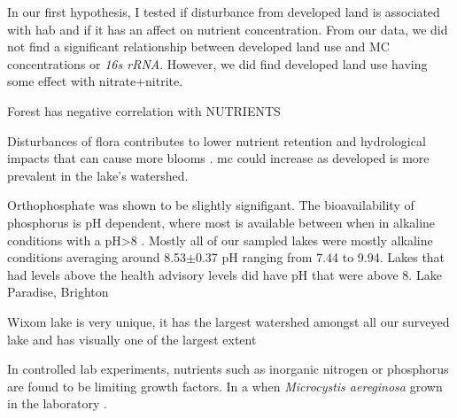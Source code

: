 
In our first hypothesis, I tested if disturbance from developed land is associated with \gls{hab} and if it has an affect on nutrient concentration.  From our data, we did not find a significant relationship between developed land use and MC concentrations or \emph{16s rRNA}. However, we did find developed land use having some effect with nitrate+nitrite.

Forest has negative correlation with NUTRIENTS

Disturbances of flora contributes to lower nutrient retention and hydrological impacts that can cause more blooms \cite{anderson_harmful_2002, codd_cyanobacterial_2000, fraterrigo_influence_2008}.
\gls{mc} could increase as developed is more prevalent in the lake's watershed.


Orthophosphate was shown to be slightly signifigant. The bioavailability of phosphorus is pH dependent, where most is available between when in alkaline conditions with a pH>8 \cite{lucas_relationships_1961}.
Mostly all of our sampled lakes were mostly alkaline conditions averaging around 8.53$\pm$0.37 pH ranging from 7.44 to 9.94. Lakes that had levels above the health advisory levels did have pH that were above 8. Lake Paradise, Brighton %

Wixom lake is very unique, it has the largest watershed amongst all our surveyed lake and has visually one of the largest extent



In controlled lab experiments, nutrients such as inorganic nitrogen or phosphorus are found to be limiting growth factors. In a  when \emph{Microcystis aereginosa} grown in the laboratory \cite{xiao_colony_2018, yema_role_2016}.


